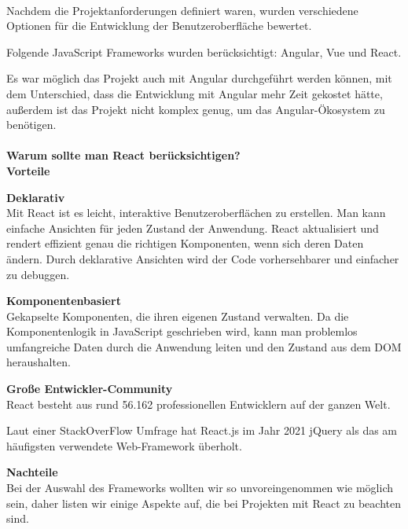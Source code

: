 \paragraph{}

Nachdem die Projektanforderungen definiert waren, wurden verschiedene Optionen für die Entwicklung der Benutzeroberfläche bewertet.

Folgende JavaScript Frameworks wurden berücksichtigt: Angular, Vue und React.


Es war möglich das Projekt auch mit Angular durchgeführt werden können, mit dem Unterschied, dass die Entwicklung mit Angular mehr Zeit gekostet hätte, außerdem ist das Projekt nicht komplex genug, um das Angular-Ökosystem zu benötigen.
\paragraph{}
\textbf{Warum sollte man React berücksichtigen?}\\
\newline
\textbf{Vorteile} 
\newline

\textbf{Deklarativ} \\
Mit React ist es leicht, interaktive Benutzeroberflächen zu erstellen. Man kann einfache Ansichten für jeden Zustand der Anwendung. React aktualisiert und rendert effizient genau die richtigen Komponenten, wenn sich deren Daten ändern.
Durch deklarative Ansichten wird der Code vorhersehbarer und einfacher zu debuggen.
\newline

\textbf{Komponentenbasiert}\\
Gekapselte Komponenten, die ihren eigenen Zustand verwalten.
Da die Komponentenlogik in JavaScript geschrieben wird, kann man problemlos umfangreiche Daten durch die Anwendung leiten und den Zustand aus dem DOM heraushalten.
\newline

\textbf{Große Entwickler-Community}\\
React besteht aus rund 56.162 professionellen Entwicklern auf der ganzen Welt.

Laut einer StackOverFlow Umfrage hat React.js im Jahr 2021 jQuery als das am häufigsten verwendete Web-Framework überholt.
\newline

\textbf{Nachteile}\\
Bei der Auswahl des Frameworks wollten wir so unvoreingenommen wie möglich sein, daher listen wir einige Aspekte auf, die bei Projekten mit React zu beachten sind.
\newline

